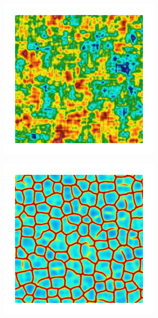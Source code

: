 \begin{figure}[!htb]
\begin{subfigure}[b]{0.15\textwidth}
    \caption{}
    \label{fig: Chapter4/2D/Gc_exp_cartesian_5_5_rho_0_seed_d}
  \end{subfigure}
  \begin{subfigure}[b]{0.15\textwidth}
    \includegraphics[width=\textwidth]{Chapter4/figures/2D/psic_exp_cartesian_5_5_rho_0_seed_d.png}
    \caption{}
    \label{fig: Chapter4/2D/psic_exp_cartesian_5_5_rho_0_seed_d}
  \end{subfigure}
  \begin{subfigure}[b]{0.15\textwidth}
    \includegraphics[width=\textwidth]{Chapter4/figures/2D/d_exp_cartesian_5_5_rho_0_seed_d.png}
    \caption{}
    \label{fig: Chapter4/2D/d_exp_cartesian_5_5_rho_0_seed_d}
  \end{subfigure}


\end{figure}

